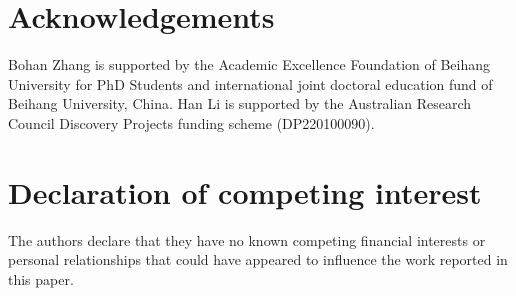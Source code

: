 \documentclass[a4paper,review,12pt,authoryear]{elsarticle}
\begin{document}
\section*{Acknowledgements}

Bohan Zhang is supported by the Academic Excellence Foundation of Beihang University for PhD Students and international joint doctoral education fund of Beihang University, China. Han Li is supported by the Australian Research Council Discovery Projects funding scheme (DP220100090).

\section*{Declaration of competing interest}

The authors declare that they have no known competing financial interests or personal relationships that could have appeared to influence the work reported in this paper. 

 

\begingroup
{}


\endgroup
\end{document}
